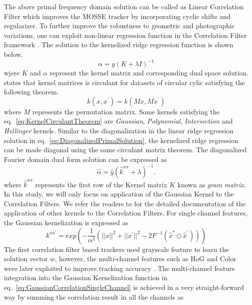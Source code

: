 \documentclass[10pt,twocolumn,letterpaper]{article}
\newcounter{ct}
\begin{document}
The above primal frequency domain solution can be called as Linear Correlation Filter which improves the MOSSE tracker by incorporating cyclic shifts and regularizer. To further improve the robustness to geometric and photographic variations, one can exploit non-linear regression function in the Correlation Filter framework \cite{henriques2015high}. The solution to the kernelized ridge regression function is shown below.
\begin{equation}
\alpha = y(K+\lambda I)^{-1}
\end{equation}
wjere $K$ and $\alpha$ represent the kernel matrix and corresponding dual space solution. \cite{henriques2015high} states that kernel matrices is circulant for datasets of circular cylic satisfying the following theorem. 
\begin{equation}
k(x,x^{'}) = k(Mx,Mx^{'})
\label{eq:KernelCirculantTheorem}
\end{equation}
where $M$ represents the permutation matrix. Some kernels satisfying the eq.~\ref{eq:KernelCirculantTheorem} are \textit{Gaussian}, \textit{Polynomial}, \textit{Intersection} and \textit{Hellinger} kernels. Similar to the diagonalization in the linear ridge regression solution in eq.~\ref{eq:DiagonalizedPrimalSolution}, the kernelized ridge regression can be made diagonal using the same circulant matrix theorem.  The diagonalized Fourier domain dual form solution can be expressed as
\begin{equation}
\hat{\alpha} = \hat{y}(\hat{k}^{xx}+\lambda)^{-1}
\label{eq:FourierDualDomainSolution}.
\end{equation}
where $\hat{k}^{xx}$ represents the first row of the Kernel matrix $K$ known as \textit{gram matrix}. In this study, we will only focus on application of the Gaussian Kernel to the Correlation Filters. We refer the readers to \cite{henriques2015high} for the detailed documentation of the application of other kernels to the Correlation Filters. For single channel features, the Gaussian kernelization is expressed as
\begin{equation}
k^{xx^{'}} = exp(-\dfrac{1}{\alpha^{2}}(||x||^{2}+||x^{'}||^{2}-2F^{-1}(\hat{x}^{*}\odot \hat{x}^{'})))
\label{eq:GaussianCorrelationSingleChannel}
\end{equation}
The first correlation filter based trackers used grayscale feature to learn the solution vector $w$, however, the multi-channel features such as HoG and Color were later exploited to improve tracking accuracy \cite{henriques2015high,galoogahi2013multi,tang2015multi,ma2015long,bibi2015multi}. The multi-channel feature integration into the Gaussian Kernelization function in eq.~\ref{eq:GaussianCorrelationSingleChannel} is achieved in a very straight-forward way by summing the correlation result in all the channels as
\end{document}
